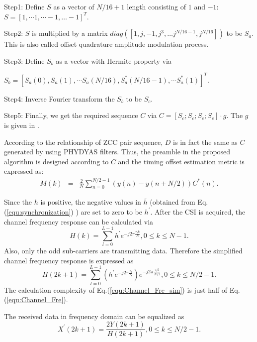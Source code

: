 \documentclass[journal]{IEEEtran}
\begin{document}
    Step1: Define $S$ as a vector of $N/16+1$ length consisting of $1$ and $-1$:
        $S=[1, \cdots 1, \cdots -1, \ldots -1]^T$.

    Step2: $S$ is multiplied by a matrix $diag([1,j,-1,j^3,\ldots j^{N/16-1},j^{N/16}])$ to be $S_{a}$. This is also called offset quadrature amplitude modulation process.

    Step3: Define $S_b$ as a vector with Hermite property via

        $S_b=[S_{a}(0),S_{a}(1),\cdots S_{a}(N/16),S_{a}^*(N/16-1),\cdots S_{a}^*(1)]^T$.

	Step4: Inverse Fourier transform the $S_b$ to be $S_c$.

    Step5: Finally, we get the required sequence $C$ via $C=[ S_c; S_c; S_c; S_c]\cdot g$. The $g$ is given in \cite{Bellanger2010}.

    According to the relationship of ZCC pair sequence, $D$ is in fact the same as $C$ generated by using PHYDYAS filters. Thus, the preamble in the proposed algorithm is designed according to $C$ and the timing offset estimation metric is expressed as:
    \begin{eqnarray}\label{equ:synchronization}
          M(k)&=&\frac{2}{N}\sum_{n=0}^{N/2-1}(y(n)-y(n+N/2))C^*(n).
    \end{eqnarray}

    Since the $ h $ is positive, the negative values in $ \bar{h} $ (obtained from Eq.(\ref{equ:synchronization}) ) are set to zero to be $ h^{'} $. After the CSI is acquired, the channel frequency response can be calculated via
    \begin{equation}\label{equ:Channel_Fre}
          H(k)=\sum_{l=0}^{L-1}h^{'}e^{-j2\pi\frac{\tau_l k}{N}},0\leq k \leq N-1.
    \end{equation}
    Also, only the odd sub-carriers are transmitting data. Therefore the simplified channel frequency response is expressed as
    \begin{equation}\label{equ:Channel_Fre_sim}
          H(2k+1)=\sum_{l=0}^{L-1}(h^{'}e^{-j2\pi\frac{\tau_l}{N}})e^{-j2\pi\frac{\tau_l k}{N/2}},0\leq k\leq N/2-1.
    \end{equation}
    The calculation complexity of Eq.(\ref{equ:Channel_Fre_sim}) is just half of Eq.(\ref{equ:Channel_Fre}).

    The received data in frequency domain can be equalized as
    \begin{equation}\label{equ:equalizer}
       X^{'}(2k+1)=\dfrac{2Y(2k+1)}{H(2k+1)},0\leq k\leq N/2-1.
    \end{equation}
\end{document}
